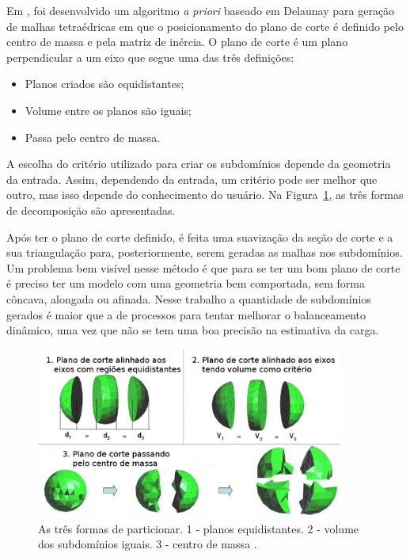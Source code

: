 Em \cite{bib:Ivanov06}, foi desenvolvido um algoritmo \textit{a priori} baseado em Delaunay para geração de malhas tetraédricas em que o posicionamento do plano de corte é definido pelo centro de massa e pela matriz de inércia. O plano de corte é um plano perpendicular a um eixo que segue uma das três definições:

\begin{itemize}
  \item Planos criados são equidistantes;

  \item Volume entre os planos são iguais;

  \item Passa pelo centro de massa.
\end{itemize}

A escolha do critério utilizado para criar os subdomínios depende da geometria da entrada. Assim, dependendo da entrada, um critério pode ser melhor que outro, mas isso depende do conhecimento do usuário. Na Figura~\ref{fig:ivanov06}, as três formas de decomposição são apresentadas.

Após ter o plano de corte definido, é feita uma suavização da seção de corte e a sua triangulação para, posteriormente, serem geradas as malhas nos subdomínios. Um problema bem visível nesse método é que para se ter um bom plano de corte é preciso ter um modelo com uma geometria bem comportada, sem forma côncava, alongada ou afinada. Nesse trabalho a quantidade de subdomínios gerados é maior que a de processos para tentar melhorar o balanceamento dinâmico, uma vez que não se tem uma boa precisão na estimativa da carga.

 \begin{figure}[htbp]
     \centering
     \includegraphics[width=0.9\textwidth]{fig/ivanov06.jpg}
     \caption{As três formas de particionar. 1 - planos equidistantes. 2 - volume dos subdomínios iguais. 3 - centro de massa \cite{bib:Ivanov06}.}
     \label{fig:ivanov06}
 \end{figure}

